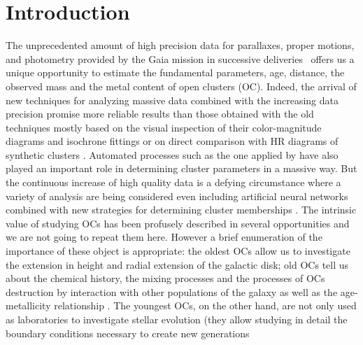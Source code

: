 \documentclass{aa}
\begin{document}

\maketitle


\section{Introduction}

 The unprecedented amount of high precision data for parallaxes, proper motions,
 and photometry provided by the Gaia mission in successive
 deliveries~\citep[DR2 and EDR3,][]{Gaia_2016,Gaia_EDR3} offers us a unique
 opportunity to estimate the fundamental parameters, age, distance, the observed
 mass and the metal content of open clusters (OC).
 Indeed, the arrival of new techniques for
 analyzing massive data combined with the increasing data precision promise
 more reliable results than those obtained with the old techniques mostly
 based on the visual inspection of their color-magnitude diagrams and
 isochrone fittings \citep{Phelps1994} or on direct comparison with HR diagrams
 of synthetic clusters \citep{Siess1997}. Automated processes such as the one
 applied by \cite{Kharchenko_2012} have also played an important role in
 determining cluster parameters in a massive way. But the continuous increase
 of high quality data is a defying circumstance where a variety of analysis are
 being considered even including artificial neural networks
 \citep{Cantat_2020} combined with new strategies for determining cluster
 memberships \citep{Krone2014,Cantat2018}.
 The intrinsic value of studying OCs has been profusely described in several
 opportunities and we are not going to repeat them here. However a brief
 enumeration of the importance of these object is appropriate: the oldest OCs
 allow us to investigate the extension in height and radial extension of the
 galactic disk; old OCs tell us about the chemical history, the mixing processes
 and the processes of OCs destruction by interaction with other populations of
 the galaxy as well as the age-metallicity relationship 
 \citep{Friel1995,Tosi2004,Hayes2015}. The youngest OCs, on the other hand, are
 not only used as laboratories to investigate stellar evolution (they allow
 studying in detail the boundary conditions necessary to create new generations
\end{document}

